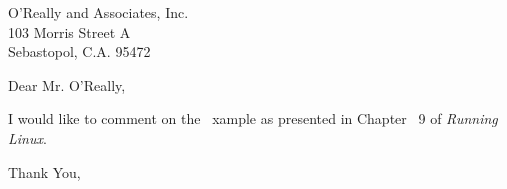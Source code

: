 \address {755 Chmod Way \\ Apt 0x7F \\
	Pipeline, N.M. 09915}
\signature{Bommer Petway}


\begin{letter} {O'Really and Associates, Inc. \\
		103 Morris Street A \\
		Sebastopol, C.A. 95472}

\opening{Dear Mr. O'Really,}

I would like to comment on the \LaTex\ xample as presented in Chapter ~9 of {\em Running Linux}.

\closing{Thank You,}

\end{letter}
